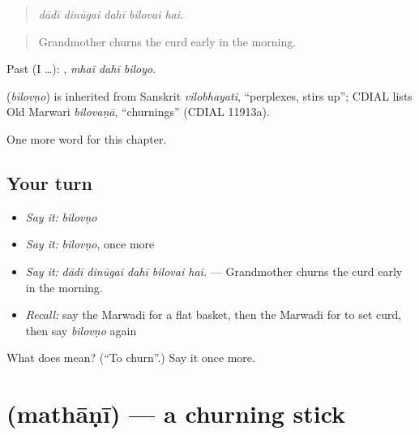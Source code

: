 \begin{quote}
    
\end{quote}

\begin{quote}
\emph{dādī dinūgai dahī bilovai hai.}
\end{quote}

\begin{quote}
Grandmother churns the curd early in the morning.
\end{quote}

Past (I …):   , \emph{mhaĩ dahī biloyo}.

\begin{cousinweb}
\textbf{} (\emph{bilovṇo}) is inherited from Sanskrit \emph{vilobhayati}, \textquotedblleft{}perplexes, stirs up\textquotedblright{}; CDIAL lists Old Marwari \emph{bilovaṇā}, \textquotedblleft{}churnings\textquotedblright{} (CDIAL 11913a).
\end{cousinweb}

\begin{grammarlens}[title={What you've built}]
One more word for this chapter.
\end{grammarlens}

\subsection*{Your turn}
\begin{itemize}
\raggedright
  \item \emph{Say it:} \emph{bilovṇo}
  \item \emph{Say it:} \emph{bilovṇo}, once more
  \item \emph{Say it:} \emph{dādī dinūgai dahī bilovai hai.} — Grandmother churns the curd early in the morning.
  \item \emph{Recall:} say the Marwadi for a flat basket, then the Marwadi for to set curd, then say \emph{bilovṇo} again
\end{itemize}

\begin{tcolorbox}[breakable,colback=teal!4,colframe=teal!35!black,title={Before you move on}]
What does  mean? (\textquotedblleft{}To churn\textquotedblright{}.) Say it once more.
\end{tcolorbox}
\section[\texorpdfstring{\mw{मथाणी} (mathāṇī)}{मथाणी (mathāṇī)}]{ (mathāṇī) — a churning stick}

